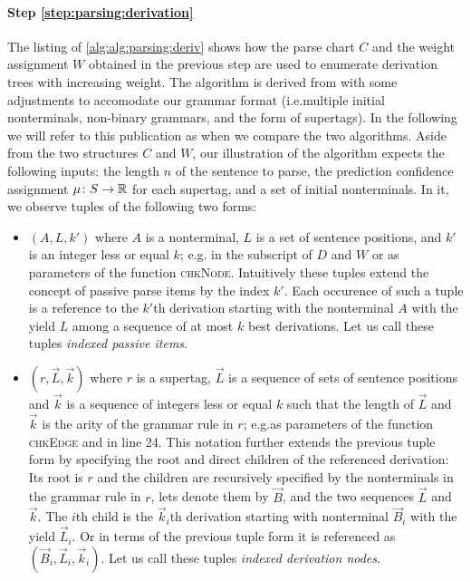 \documentclass[../document.tex]{subfiles}
\begin{document}
    \paragraph{Step \ref{step:parsing:derivation}}
    The listing of \cref{alg:alg:parsing:deriv} shows how the parse chart \(C\) and the weight assignment \(W\) obtained in the previous step are used to enumerate derivation trees with increasing weight.
    The algorithm is derived from \citet[Algorithm 2, 3 and 4]{HuangChiang05} with some adjustments to accomodate our grammar format (i.e.\@ multiple initial nonterminals, non-binary grammars, and the form of  supertags).
    In the following we will refer to this publication as  when we compare the two algorithms.
    Aside from the two structures \(C\) and \(W\), our illustration of the algorithm expects the following inputs: the length \(n\) of the sentence to parse, the prediction confidence assignment \(\mu\colon S \to \mathbb{R}\) for each supertag, and a set of initial nonterminals.
    In it, we observe tuples of the following two forms:
    \begin{itemize}
        \item
            \((A, L, k')\) where \(A\) is a nonterminal, \(L\) is a set of sentence positions, and \(k'\) is an integer less or equal \(k\); e.g. in the subscript of \(D\) and \(W\) or as parameters of the function \textsc{chkNode}.
            Intuitively these tuples extend the concept of passive parse items by the index \(k'\).
            Each occurence of such a tuple is a reference to the \(k'\)th derivation starting with the nonterminal \(A\) with the yield \(L\) among a sequence of at most \(k\) best derivations.
            Let us call these tuples \emph{indexed passive items}.
        \item
            \((r, \vec{L}, \vec{k})\) where \(r\) is a supertag, \(\vec{L}\) is a sequence of sets of sentence positions and \(\vec{k}\) is a sequence of integers less or equal \(k\) such that the length of \(\vec{L}\) and \(\vec{k}\) is the arity of the grammar rule in \(r\); e.g.\@ as parameters of the function \textsc{chkEdge} and in line 24.
            This notation further extends the previous tuple form by specifying the root and direct children of the referenced derivation:
                Its root is \(r\) and the children are recursively specified by the  nonterminals in the grammar rule in \(r\), lets denote them by \(\vec{B}\), and the two sequences \(\vec{L}\) and \(\vec{k}\).
                The \(i\)th child is the \(\vec{k}_i\)th derivation starting with nonterminal \(\vec{B}_i\) with the yield \(\vec{L}_i\).
                Or in terms of the previous tuple form it is referenced as \((\vec{B}_i, \vec{L}_i, \vec{k}_i)\).
            Let us call these tuples \emph{indexed derivation nodes}.
    \end{itemize}
\end{document}
